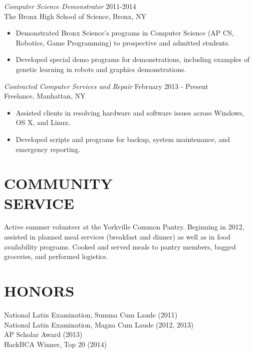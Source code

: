 \documentclass[margin]{res}
\begin{document}
\begin{resume}
                 {\sl Computer Science Demonstrator} \hfill 2011-2014 \\
                The Bronx High School of Science, Bronx, NY
                  \begin{itemize}
                   \item Demonstrated Bronx Science's programs in Computer Science
                   		 (AP CS, Robotics, Game Programming) to prospective and admitted students.
                   \item Developed special demo programs for demonstrations, including 
                   		 examples of genetic learning in robots and graphics demonstrations.
                   \end{itemize} 
 
                {\sl Contracted Computer Services and Repair} \hfill February 2013 - Present \\
                Freelance, Manhattan, NY 
                 \begin{itemize}  \itemsep -2pt
                 \item	Assisted clients in resolving hardware and software issues
                 		across Windows, OS X, and Linux.
                 \item	Developed scripts and programs for backup, system maintenance,
                 		and emergency reporting. 
                 \end{itemize} 
                 
 
\section{COMMUNITY \\ SERVICE} Active summer volunteer at the Yorkville Common Pantry.
								Beginning in 2012, assisted in planned meal services 
								(breakfast and dinner) as well as in food availability 
								programs. Cooked and served meals to pantry members, 
								bagged groceries, and performed logistics.
								
\section{HONORS} National Latin Examination, Summa Cum Laude (2011) \\
				 National Latin Examination, Magna Cum Laude (2012, 2013) \\
				 AP Scholar Award (2013) \\
				 HackBCA Winner, Top 20 (2014) \\


\end{resume}
\end{document}
